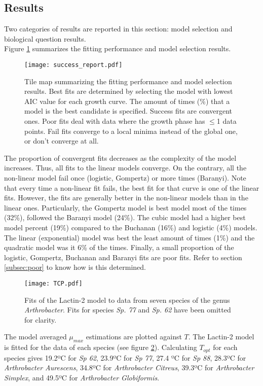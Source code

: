 \documentclass[titlepage,11pt]{article}
\begin{document}
\begin{linenumbers}
		\section{Results}
		Two categories of results are reported in this section: model selection and biological question results. \\
		Figure \ref{fig:success_report} summarizes the fitting performance and model selection results.
		\begin{figure}[h!]
			\texttt{[image: success\_report.pdf]}
			\centering
			\caption{Tile map summarizing the fitting performance and model selection results. Best fits are determined by selecting the model with lowest AIC value for each growth curve. The amount of times (\%) that a model is the best candidate is specified. Success fits are convergent ones. Poor fits deal with data where the growth phase has $ \leq $1 data points. Fail fits converge to a local minima instead of the global one, or don't converge at all.}
			\label{fig:success_report}
		\end{figure}
		The proportion of convergent fits decreases as the complexity of the model increases. Thus, all fits to the linear models converge. On the contrary, all the non-linear model fail once (logistic, Gompertz) or more times (Baranyi). Note that every time a non-linear fit fails, the best fit for that curve is one of the linear fits. However, the fits are generally better in the non-linear models than in the linear ones. Particularly, the Gompertz model is best model most of the times (32\%), followed the Baranyi model (24\%). The cubic model had a higher best model percent (19\%) compared to the Buchanan (16\%) and logistic (4\%) models. The linear (exponential) model was best the least amount of times (1\%) and the quadratic model was it 6\% of the times. Finally, a small proportion of the logistic, Gompertz, Buchanan and Baranyi fits are poor fits. Refer to section \ref{subsec:poor} to know how is this determined.\\
		\begin{figure}[h]
			\texttt{[image: TCP.pdf]}
			\centering
			\caption{Fits of the Lactin-2 model to data from seven species of the genus \textit{Arthrobacter}. Fits for species \textit{Sp. 77} and \textit{Sp. 62} have been omitted for clarity.}
			\label{fig:TCP}
		\end{figure}
		The model averaged $ \mu_{max} $  estimations are plotted against $ T $. The Lactin-2 model is fitted for the data of each species (see figure \ref{fig:TCP}). Calculating $ T_{opt} $ for each species gives 19.2ºC for \textit{Sp 62}, 23.9ºC for \textit{Sp 77}, 27.4 ºC for \textit{Sp 88}, 28.3ºC for \textit{Arthrobacter Aurescens}, 34.8ºC for \textit{Arthrobacter Citreus}, 39.3ºC for \textit{Arthrobacter Simplex}, and 49.5ºC for \textit{Arthrobacter Globiformis}. 

\end{linenumbers}
\end{document}
